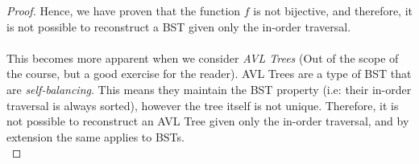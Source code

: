 \documentclass[12pt]{article}
\begin{document}
\begin{proof}
    Hence, we have proven that the function $f$ is not bijective, and therefore, it is not possible to reconstruct a BST given only the in-order traversal.
    \\ \\This becomes more apparent when we consider \textit{AVL Trees} (Out of the scope of the course, but a good exercise for the reader). AVL Trees are a type of BST that are \textit{self-balancing}. This means they maintain the BST property (i.e: their in-order traversal is always sorted), however the tree itself is not unique. Therefore, it is not possible to reconstruct an AVL Tree given only the in-order traversal, and by extension the same applies to BSTs.
    \\
  \end{proof}
\end{document}
